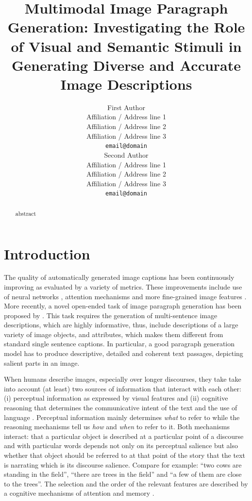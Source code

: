 \documentclass[11pt,a4paper]{article}
\title{Multimodal Image Paragraph Generation: Investigating the Role of Visual and Semantic Stimuli in Generating Diverse and Accurate Image Descriptions}
\author{First Author \\
 Affiliation / Address line 1 \\
 Affiliation / Address line 2 \\
 Affiliation / Address line 3 \\
 \texttt{email@domain} \\\And
 Second Author \\
 Affiliation / Address line 1 \\
 Affiliation / Address line 2 \\
 Affiliation / Address line 3 \\
 \texttt{email@domain} \\}
\date{}
\begin{document}
\maketitle
\begin{abstract}
abstract

\end{abstract}

\section{Introduction}\label{sec:introduction}

The quality of automatically generated image captions \cite{bernardi2016automatic} has been continuously improving as evaluated by a variety of metrics.
These improvements include use of neural networks \cite{kiros14,vinyals2014tell}, attention mechanisms \cite{xu2015attend,Lu2016} and more fine-grained image features \cite{anderson2017bottomup}.
More recently, a novel open-ended task of image paragraph generation has been proposed by .
This task requires the generation of multi-sentence image descriptions, which are highly informative, thus, include descriptions of a large variety of image objects, and attributes, which makes them different from standard single sentence captions.
In particular, a good paragraph generation model has to produce descriptive, detailed and coherent text passages, depicting salient parts in an image.

When humans describe images, especially over longer discourses, they take take into account (at least) two sources of information that interact with each other: (i) perceptual information as expressed by visual features and (ii) cognitive reasoning that determines the communicative intent of the text and the use of language \cite{Kelleher:2020aa}.
Perceptual information mainly determines \emph{what} to refer to while the reasoning mechanisms tell us \emph{how} and \emph{when} to refer to it.
Both mechanisms interact: that a particular object is described at a particular point of a discourse and with particular words depends not only on its perceptual salience but also whether that object should be referred to at that point of the story that the text is narrating which is its discourse salience.
Compare for example: ``two cows are standing in the field'', ``there are trees in the field'' and ``a few of them are close to the trees''.
The selection and the order of the relevant features are described by a cognitive mechanisms of attention and memory \cite{Lavie:2004aa,Dobnik:2016ac}.
\end{document}
